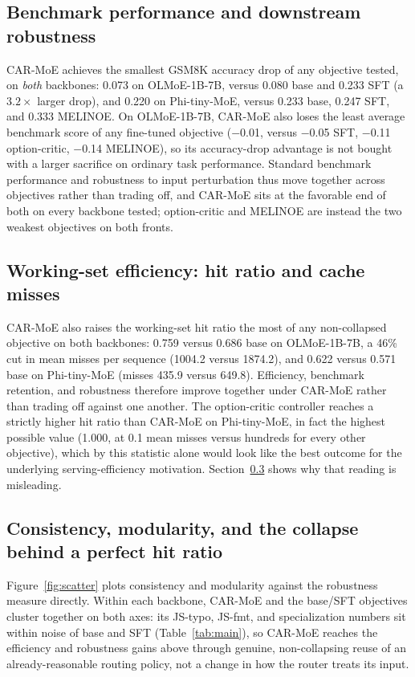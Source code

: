 \documentclass{article}
\begin{document}
\subsection{Benchmark performance and downstream robustness}

CAR-MoE achieves the smallest GSM8K accuracy drop of any objective tested, on
\emph{both} backbones: 0.073 on OLMoE-1B-7B, versus 0.080 base and 0.233 SFT (a
$3.2\times$ larger drop), and 0.220 on Phi-tiny-MoE, versus 0.233 base, 0.247 SFT, and
0.333 MELINOE. On OLMoE-1B-7B, CAR-MoE also loses the least average benchmark score of
any fine-tuned objective ($-$0.01, versus $-$0.05 SFT, $-$0.11 option-critic, $-$0.14
MELINOE), so its accuracy-drop advantage is not bought with a larger sacrifice on
ordinary task performance. Standard benchmark performance and robustness to input
perturbation thus move together across objectives rather than trading off, and CAR-MoE
sits at the favorable end of both on every backbone tested; option-critic and MELINOE are
instead the two weakest objectives on both fronts.

\subsection{Working-set efficiency: hit ratio and cache misses}

CAR-MoE also raises the working-set hit ratio the most of any non-collapsed objective on
both backbones: 0.759 versus 0.686 base on OLMoE-1B-7B, a 46\% cut in mean misses per
sequence (1004.2 versus 1874.2), and 0.622 versus 0.571 base on Phi-tiny-MoE (misses 435.9
versus 649.8). Efficiency, benchmark retention, and robustness therefore improve together
under CAR-MoE rather than trading off against one another. The option-critic controller
reaches a strictly higher hit ratio than CAR-MoE on Phi-tiny-MoE, in fact the highest
possible value (1.000, at 0.1 mean misses versus hundreds for every other objective), which
by this statistic alone would look like the best outcome for the underlying
serving-efficiency motivation. Section~\ref{sec:consistency-results} shows why that
reading is misleading.

\subsection{Consistency, modularity, and the collapse behind a perfect hit ratio}
\label{sec:consistency-results}
\label{sec:discussion}

Figure~\ref{fig:scatter} plots consistency and modularity against the robustness measure
directly. Within each backbone, CAR-MoE and the base/SFT objectives cluster together on
both axes: its JS-typo, JS-fmt, and specialization numbers sit within noise of base and
SFT (Table~\ref{tab:main}), so CAR-MoE reaches the efficiency and robustness gains above
through genuine, non-collapsing reuse of an already-reasonable routing policy, not a
change in how the router treats its input.
\end{document}

